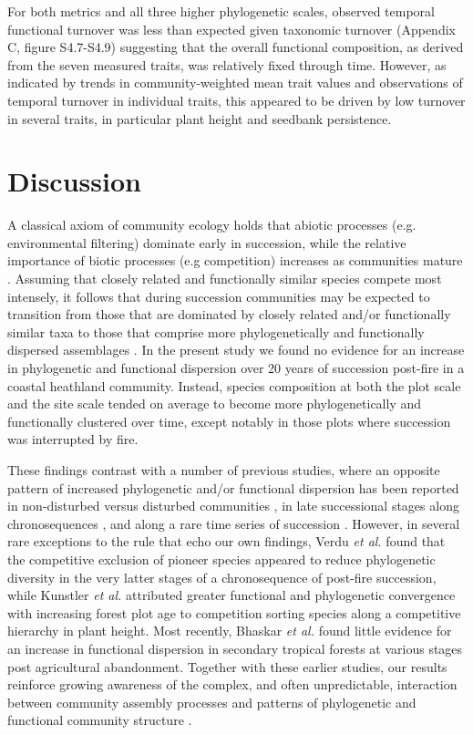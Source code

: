 For both metrics and all three higher phylogenetic scales, observed temporal functional turnover was less than expected given taxonomic turnover (Appendix C, figure S4.7-S4.9) suggesting that the overall functional composition, as derived from the seven measured traits, was relatively fixed through time. However, as indicated by trends in community-weighted mean trait values and observations of temporal turnover in individual traits, this appeared to be driven by low turnover in several traits, in particular plant height and seedbank persistence. 

\section{Discussion}

A classical axiom of community ecology holds that abiotic processes (e.g. environmental filtering) dominate early in succession, while the relative importance of biotic processes (e.g competition) increases as communities mature \citep{Clements1916, Connell1977, Walker1987, Wilson1999}. Assuming that closely related and functionally similar species compete most intensely, it follows that during succession communities may be expected to transition from those that are dominated by closely related and/or functionally similar taxa to those that comprise more phylogenetically and functionally dispersed assemblages \citep{Purschke2013, Bhaskar2014}. In the present study we found no evidence for an increase in phylogenetic and functional dispersion over 20 years of succession post-fire in a coastal heathland community. Instead, species composition at both the plot scale and the site scale tended on average to become more phylogenetically and functionally clustered over time, except notably in those plots where succession was interrupted by fire. 

These findings contrast with a number of previous studies, where an opposite pattern of increased phylogenetic and/or functional dispersion has been reported in non-disturbed versus disturbed communities \citep{Dinnage2009,Helmus2010}, in late successional stages along chronosequences \citep{Letcher2010, Purschke2013}, and along a rare time series of succession \citep{Norden2012}. However, in several rare exceptions to the rule that echo our own findings, Verdu \textit{et al.} \citep{Verdu2009} found that the competitive exclusion of pioneer species appeared to reduce phylogenetic diversity in the very latter stages of a chronosequence of post-fire succession, while Kunstler \textit{et al.} \citep{Kunstler2012} attributed greater functional and phylogenetic convergence with increasing forest plot age to competition sorting species along a competitive hierarchy in plant height. Most recently, Bhaskar \textit{et al.} \citep{Bhaskar2014} found little evidence for an increase in functional dispersion in secondary tropical forests at various stages post agricultural abandonment. Together with these earlier studies, our results reinforce growing awareness of the complex, and often unpredictable, interaction between community assembly processes and patterns of phylogenetic and functional community structure \citep{Mayfield2010, Kunstler2012, Price2013, Bennett2013}.

